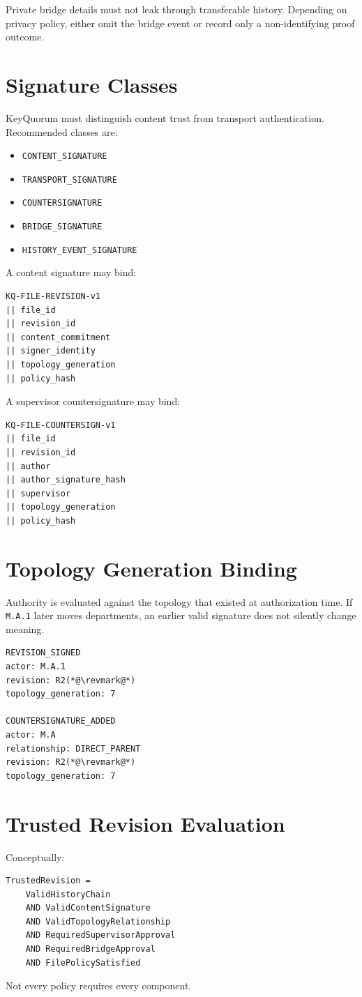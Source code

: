 \documentclass[11pt]{article}
\begin{document}
Private bridge details must not leak through transferable history. Depending on privacy policy, either omit the bridge event or record only a non-identifying proof outcome.

\section{Signature Classes}
KeyQuorum must distinguish content trust from transport authentication. Recommended classes are:
\begin{itemize}[leftmargin=1.5em]
  \item \texttt{CONTENT\_SIGNATURE}
  \item \texttt{TRANSPORT\_SIGNATURE}
  \item \texttt{COUNTERSIGNATURE}
  \item \texttt{BRIDGE\_SIGNATURE}
  \item \texttt{HISTORY\_EVENT\_SIGNATURE}
\end{itemize}

A content signature may bind:
\begin{lstlisting}
KQ-FILE-REVISION-v1
|| file_id
|| revision_id
|| content_commitment
|| signer_identity
|| topology_generation
|| policy_hash
\end{lstlisting}

A supervisor countersignature may bind:
\begin{lstlisting}
KQ-FILE-COUNTERSIGN-v1
|| file_id
|| revision_id
|| author
|| author_signature_hash
|| supervisor
|| topology_generation
|| policy_hash
\end{lstlisting}

\section{Topology Generation Binding}
Authority is evaluated against the topology that existed at authorization time. If \texttt{M.A.1} later moves departments, an earlier valid signature does not silently change meaning.
\begin{lstlisting}
REVISION_SIGNED
actor: M.A.1
revision: R2(*@\revmark@*)
topology_generation: 7

COUNTERSIGNATURE_ADDED
actor: M.A
relationship: DIRECT_PARENT
revision: R2(*@\revmark@*)
topology_generation: 7
\end{lstlisting}

\section{Trusted Revision Evaluation}
Conceptually:
\begin{lstlisting}
TrustedRevision =
    ValidHistoryChain
    AND ValidContentSignature
    AND ValidTopologyRelationship
    AND RequiredSupervisorApproval
    AND RequiredBridgeApproval
    AND FilePolicySatisfied
\end{lstlisting}
Not every policy requires every component.
\end{document}
